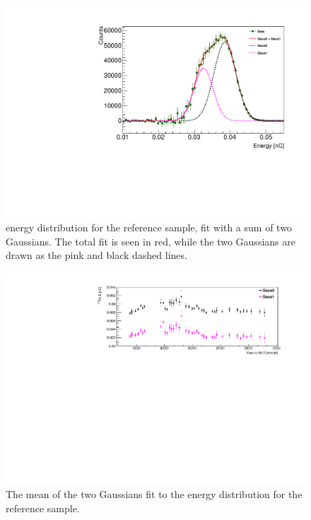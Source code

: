 \begin{figure}[h]
	\centering
	\includegraphics[width=0.6\linewidth]{tex/6-ac227-images/BNL/PoEnFit_TimeBin23_S2}
	\caption{\Po energy distribution for the reference sample, fit with a sum of two Gaussians. The total fit is seen in red, while the two Gaussians are drawn as the pink and black dashed lines.}
	\label{fig:poenfittimebin23s2}
\end{figure}

\begin{figure}[H]
	\centering
	\includegraphics[width=0.9\linewidth]{tex/6-ac227-images/BNL/PoEnMeanVsTime_S2}
	\caption{The mean of the two Gaussians fit to the \Po energy distribution for the reference sample.}
	\label{fig:poenmeanvstimes2}
\end{figure}

